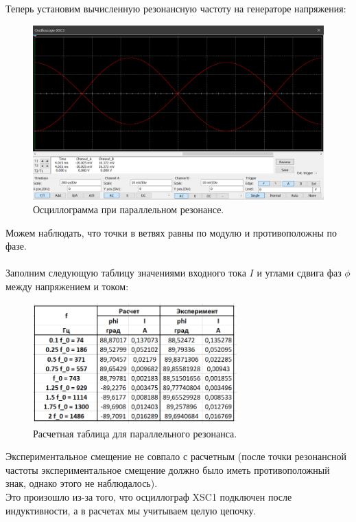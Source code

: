 \documentclass[12pt]{article}
\begin{document}
Теперь установим вычисленную резонансную частоту на генераторе напряжения:
\begin{figure}[H]
    \centering
    \includegraphics[width=\textwidth]{9_osc_plot.png}
    \caption{Осциллограмма при параллельном резонансе.}
    \label{fig:9_osc_plot}
\end{figure}
Можем наблюдать, что точки в ветвях равны по модулю и противоположны по фазе. \\
\ \\
Заполним следующую таблицу значениями входного тока $I$ и углами сдвига фаз $\phi$ между напряжением и током:
\begin{figure}[H]
    \centering
    \includegraphics[width=0.7\textwidth]{9_table.png}
    \caption{Расчетная таблица для параллельного резонанса.}
    \label{fig:9_table}
\end{figure}

Экспериментальное смещение не совпало с расчетным (после точки резонансной частоты экспериментальное смещение должно было иметь противоположный знак, однако этого не наблюдалось). \\
Это произошло из-за того, что осциллограф XSC1 подключен после индуктивности, а в расчетах мы учитываем целую цепочку.
\end{document}
